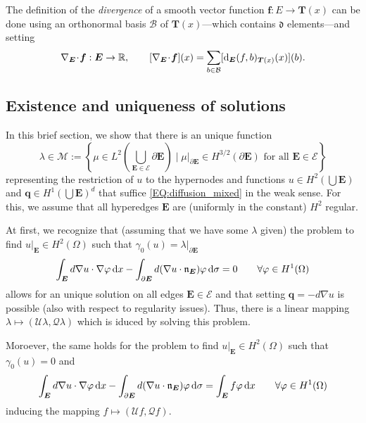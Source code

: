 \documentclass[a4paper, english, 12pt, reqno, draft]{amsart}
\theoremstyle{definition}
\theoremstyle{remark}
\numberwithin{equation}{section}
\newcommand{\setEdge}{\ensuremath{\mathcal E}}
\newcommand{\SetEdge}{\ensuremath{\boldsymbol{\mathcal E}}}
\newcommand{\Edge}{{\ensuremath{\boldsymbol E}}}
\newcommand{\locDim}{\ensuremath{\mathfrak d}}
\newcommand{\Der}{\ensuremath{\textup d_\Edge}}
\newcommand{\Nabla}{\ensuremath{\nabla_\Edge}}
\newcommand{\Div}{\ensuremath{\Nabla\!\cdot\!}}
\newcommand{\tangent}{\ensuremath{{\boldsymbol T}}}
\newcommand{\Normal}{\ensuremath{\mathfrak n_\Edge}}
\newcommand{\basis}{\ensuremath{\mathcal B}}
\newcommand{\IR}{\ensuremath{\mathbb R}}
\newcommand{\skeletalSpaceCont}{\ensuremath{\mathcal M}}
\renewcommand{\vec}[1]{\ensuremath{\boldsymbol{#1}}}
\newcommand{\dx}{\ensuremath{\, \textup d x}}
\newcommand{\ds}{\ensuremath{\, \textup d \sigma}}
\newcommand{\localU}{\ensuremath{\mathcal U}}
\newcommand{\localQ}{\ensuremath{\vec{\mathcal Q}}}
\begin{document}
The definition of the \emph{divergence} of a smooth vector function $\vec f \colon E \to \tangent(x)$ can be done using an orthonormal basis $\basis$ of $\tangent(x)$---which contains $\locDim$ elements---and setting
% 
\begin{equation*}
 \Div \vec f: \Edge \to \IR, \qquad [\Div \vec f](x) = \sum_{b \in \basis} [\Der (f, b)_{\tangent(x)} (x)](b).
\end{equation*}
% 
\subsection{Existence and uniqueness of solutions}\label{SEC:ExUnique}
% 
In this brief section, we show that there is an unique function
% 
\begin{equation}
 \lambda \in \skeletalSpaceCont := \left\{ \mu \in L^2(\bigcup_{\Edge \in \SetEdge} \partial \Edge) \; \bigg| \; \mu |_{\partial \Edge} \in H^{3/2} (\partial \Edge) \text{ for all } \Edge \in \SetEdge \right\}
\end{equation}
% 
representing the restriction of $u$ to the hypernodes and functions $u \in H^2(\bigcup \Edge)$ and $\vec q \in H^1(\bigcup \Edge)^d$ that suffice \eqref{EQ:diffusion_mixed} in the weak sense. For this, we assume that all hyperedges $\Edge$ are (uniformly in the constant) $H^2$ regular.

At first, we recognize that (assuming that we have some $\lambda$ given) the problem to find $u|_\Edge \in H^2(\Omega)$ such that $\gamma_0(u) = \lambda|_{\partial \Edge}$
% 
\begin{equation}
 \int_\Edge d \nabla u \cdot \nabla \varphi \dx - \int_{\partial \Edge} d (\nabla u \cdot \Normal) \varphi \ds = 0 \qquad \forall \varphi \in H^1(\Omega)
\end{equation}
% 
allows for an unique solution on all edges $\Edge \in \setEdge$ and that setting $\vec q = - d \nabla u$ is possible (also with respect to regularity issues). Thus, there is a linear mapping $\lambda \mapsto (\localU \lambda, \localQ\lambda)$ which is iduced by solving this problem.

Moroever, the same holds for the problem to find $u|_\Edge \in H^2(\Omega)$ such that $\gamma_0(u) = 0$ and
% 
\begin{equation}\label{EQ:cont_lambda}
 \int_\Edge d \nabla u \cdot \nabla \varphi \dx - \int_{\partial \Edge} d (\nabla u \cdot \Normal) \varphi \ds = \int_\Edge f \varphi \dx \qquad \forall \varphi \in H^1(\Omega)
\end{equation}
% 
inducing the mapping $f \mapsto (\localU f, \localQ f)$.
\end{document}
